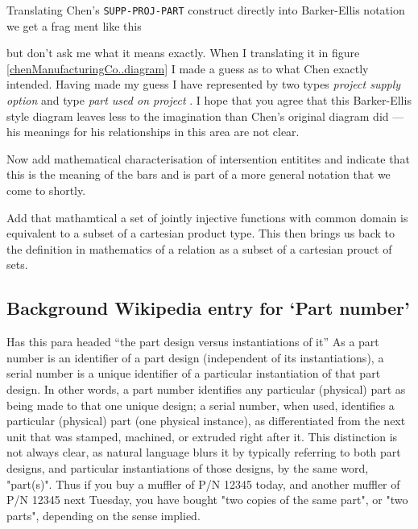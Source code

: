 \mynote 
Translating Chen's \verb'SUPP-PROJ-PART' construct directly into Barker-Ellis notation we get a frag ment like this
\begin{center}
\scalebox{0.95}{}
\end{center}
but don't ask me what it means exactly. 
When I translating it in figure \ref{chenManufacturingCo..diagram} I made a guess as to what Chen exactly intended. 
Having made my guess I have represented  by two types \textit{project supply option}
and type \textit{part used on project} . 
I hope that you agree that this Barker-Ellis style diagram leaves less to the imagination than Chen's original diagram did --- his meanings for his relationships in this area are not clear.

\mynote
Now add mathematical characterisation of intersention entitites and indicate that this is
the meaning of the bars and is part of a more general notation that we come to shortly.

\mynote Add that mathamtical a set of jointly injective functions with common domain is equivalent to a subset of a cartesian product type. This then brings us back to the definition in mathematics of a relation as a subset of a cartesian prouct of sets. 

\newpage
\subsection{Background Wikipedia entry for `Part number'}
Has this para headed ``the part design versus instantiations of it''
As a part number is an identifier of a part design (independent of its instantiations), a serial number is a unique identifier of a particular instantiation of that part design. In other words, a part number identifies any particular (physical) part as being made to that one unique design; a serial number, when used, identifies a particular (physical) part (one physical instance), as differentiated from the next unit that was stamped, machined, or extruded right after it. This distinction is not always clear, as natural language blurs it by typically referring to both part designs, and particular instantiations of those designs, by the same word, "part(s)". Thus if you buy a muffler of P/N 12345 today, and another muffler of P/N 12345 next Tuesday, you have bought "two copies of the same part", or "two parts", depending on the sense implied.

